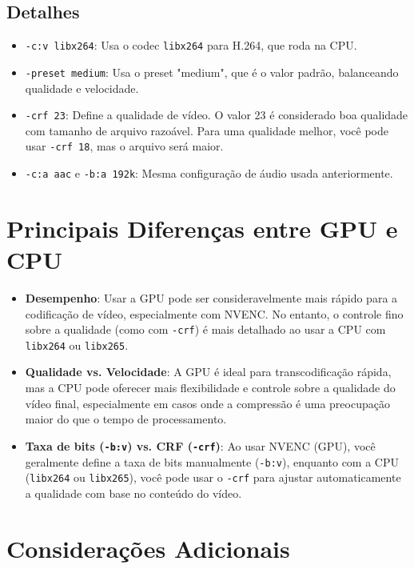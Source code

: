 \documentclass{article}
\begin{document}
\subsection{Detalhes}

\begin{itemize}
    \item \texttt{-c:v libx264}: Usa o codec \texttt{libx264} para H.264, que roda na CPU.
    \item \texttt{-preset medium}: Usa o preset "medium", que é o valor padrão, balanceando qualidade e velocidade.
    \item \texttt{-crf 23}: Define a qualidade de vídeo. O valor 23 é considerado boa qualidade com tamanho de arquivo razoável. Para uma qualidade melhor, você pode usar \texttt{-crf 18}, mas o arquivo será maior.
    \item \texttt{-c:a aac} e \texttt{-b:a 192k}: Mesma configuração de áudio usada anteriormente.
\end{itemize}

\section{Principais Diferenças entre GPU e CPU}

\begin{itemize}
    \item \textbf{Desempenho}: Usar a GPU pode ser consideravelmente mais rápido para a codificação de vídeo, especialmente com NVENC. No entanto, o controle fino sobre a qualidade (como com \texttt{-crf}) é mais detalhado ao usar a CPU com \texttt{libx264} ou \texttt{libx265}.
    
    \item \textbf{Qualidade vs. Velocidade}: A GPU é ideal para transcodificação rápida, mas a CPU pode oferecer mais flexibilidade e controle sobre a qualidade do vídeo final, especialmente em casos onde a compressão é uma preocupação maior do que o tempo de processamento.
    
    \item \textbf{Taxa de bits (\texttt{-b:v}) vs. CRF (\texttt{-crf})}: Ao usar NVENC (GPU), você geralmente define a taxa de bits manualmente (\texttt{-b:v}), enquanto com a CPU (\texttt{libx264} ou \texttt{libx265}), você pode usar o \texttt{-crf} para ajustar automaticamente a qualidade com base no conteúdo do vídeo.
\end{itemize}

\section{Considerações Adicionais}
\end{document}
